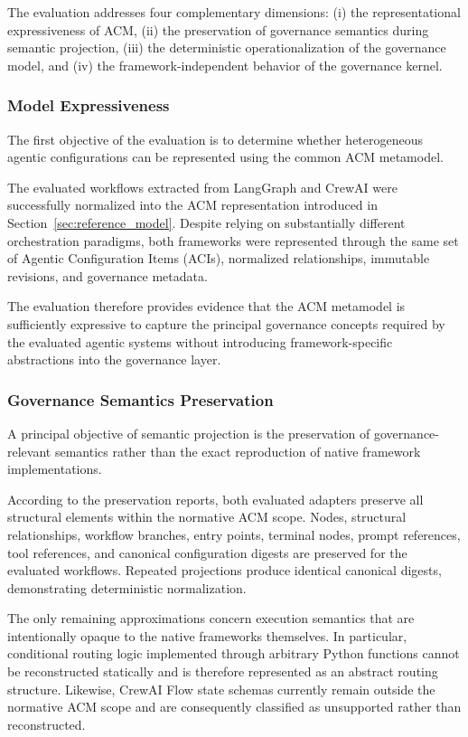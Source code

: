 \documentclass[10pt]{article}
\begin{document}
The evaluation addresses four complementary dimensions: (i) the representational expressiveness of ACM, (ii) the preservation of governance semantics during semantic projection, (iii) the deterministic operationalization of the governance model, and (iv) the framework-independent behavior of the governance kernel.

\subsubsection{Model Expressiveness}

The first objective of the evaluation is to determine whether heterogeneous agentic configurations can be represented using the common ACM metamodel.

The evaluated workflows extracted from LangGraph and CrewAI were successfully normalized into the ACM representation introduced in Section~\ref{sec:reference_model}. Despite relying on substantially different orchestration paradigms, both frameworks were represented through the same set of Agentic Configuration Items (ACIs), normalized relationships, immutable revisions, and governance metadata.

The evaluation therefore provides evidence that the ACM metamodel is sufficiently expressive to capture the principal governance concepts required by the evaluated agentic systems without introducing framework-specific abstractions into the governance layer.

\subsubsection{Governance Semantics Preservation}

A principal objective of semantic projection is the preservation of governance-relevant semantics rather than the exact reproduction of native framework implementations.

According to the preservation reports, both evaluated adapters preserve all structural elements within the normative ACM scope. Nodes, structural relationships, workflow branches, entry points, terminal nodes, prompt references, tool references, and canonical configuration digests are preserved for the evaluated workflows. Repeated projections produce identical canonical digests, demonstrating deterministic normalization.

The only remaining approximations concern execution semantics that are intentionally opaque to the native frameworks themselves. In particular, conditional routing logic implemented through arbitrary Python functions cannot be reconstructed statically and is therefore represented as an abstract routing structure. Likewise, CrewAI Flow state schemas currently remain outside the normative ACM scope and are consequently classified as unsupported rather than reconstructed.
\end{document}
